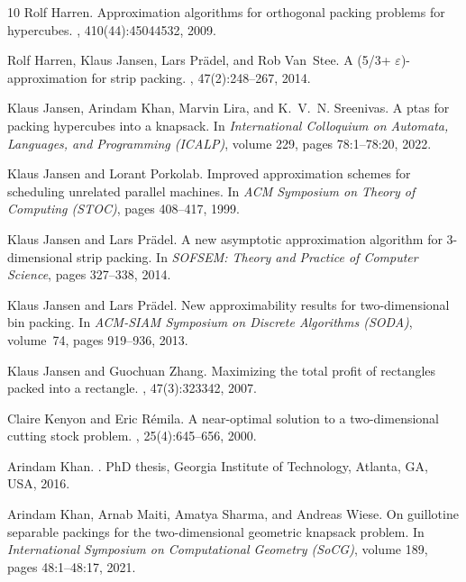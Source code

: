 \documentclass[10pt,a4paper]{amsart}
\theoremstyle{definition}
\begin{document}
\begin{thebibliography}{10}
Rolf Harren.
\newblock Approximation algorithms for orthogonal packing problems for
  hypercubes.
, 410(44):4504\textendash{}4532, 2009.

Rolf Harren, Klaus Jansen, Lars Pr{\"a}del, and Rob Van~Stee.
\newblock A (5/3+ $\varepsilon$)-approximation for strip packing.
, 47(2):248--267, 2014.

Klaus Jansen, Arindam Khan, Marvin Lira, and K.~V.~N. Sreenivas.
\newblock A ptas for packing hypercubes into a knapsack.
\newblock In {\em International Colloquium on Automata, Languages, and
  Programming (ICALP)}, volume 229, pages 78:1--78:20, 2022.

Klaus Jansen and Lorant Porkolab.
\newblock Improved approximation schemes for scheduling unrelated parallel
  machines.
\newblock In {\em ACM Symposium on Theory of Computing (STOC)}, pages 408--417,
  1999.

Klaus Jansen and Lars Pr{\"a}del.
\newblock A new asymptotic approximation algorithm for 3-dimensional strip
  packing.
\newblock In {\em SOFSEM: Theory and Practice of Computer Science}, pages
  327--338, 2014.

Klaus Jansen and Lars Prädel.
\newblock New approximability results for two-dimensional bin packing.
\newblock In {\em ACM-SIAM Symposium on Discrete Algorithms (SODA)}, volume~74,
  pages 919--936, 2013.

Klaus Jansen and Guochuan Zhang.
\newblock Maximizing the total profit of rectangles packed into a rectangle.
, 47(3):323\textendash{}342, 2007.

Claire Kenyon and Eric R{\'{e}}mila.
\newblock A near-optimal solution to a two-dimensional cutting stock problem.
, 25(4):645--656, 2000.

Arindam Khan.
.
\newblock PhD thesis, Georgia Institute of Technology, Atlanta, GA, {USA},
  2016.

Arindam Khan, Arnab Maiti, Amatya Sharma, and Andreas Wiese.
\newblock On guillotine separable packings for the two-dimensional geometric
  knapsack problem.
\newblock In {\em International Symposium on Computational Geometry (SoCG)},
  volume 189, pages 48:1--48:17, 2021.


\end{thebibliography}
\end{document}
